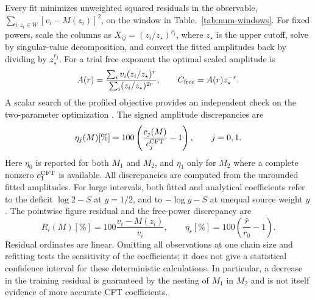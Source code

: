 \documentclass[11pt]{article}
\begin{document}
Every fit minimizes unweighted squared residuals in the
observable, $\sum_{i:z_i\in W}[v_i-M(z_i)]^2$, on the window
in Table.~\ref{tab:num-windows}. For fixed powers, scale the columns as
$X_{ij}=(z_i/z_\star)^{r_j}$, where $z_\star$ is the upper
cutoff, solve by singular-value decomposition, and convert
the fitted amplitudes back by dividing by $z_\star^{r_j}$.
For a trial free exponent the optimal scaled amplitude is
\begin{equation}
 A(r)=\frac{\sum_i v_i(z_i/z_\star)^r}{\sum_i(z_i/z_\star)^{2r}},\qquad C_{\rm free}=A(r)z_\star^{-r}.
 \label{eq:num-profile}
\end{equation}
A scalar search of the profiled objective provides an
independent check on the two-parameter optimization
\cite{numGolubPereyra}. The signed amplitude discrepancies are
\begin{equation}
 \eta_j(M)[\%]=100\left(\frac{c_j(M)}{c_j^{\rm CFT}}-1\right),
 \qquad j=0,1.
 \label{eq:num-residuals}
\end{equation}
Here $\eta_0$ is reported for both $M_1$ and $M_2$, and $\eta_1$
only for $M_2$ where a complete nonzero $c_1^{\rm CFT}$ is available.
All discrepancies are computed from the unrounded fitted amplitudes.
For large intervals, both fitted and analytical coefficients refer to
the deficit $\log2-S$ at $y=1/2$, and to $-\log y-S$ at
unequal source weight $y$.
The pointwise figure residual and the free-power discrepancy are
\begin{equation}
 R_i(M)[\%]=100\frac{v_i-M(z_i)}{v_i},\qquad
 \eta_r[\%]=100\left(\frac{\widehat r}{r_0}-1\right).
 \label{eq:num-point-residuals}
\end{equation}
Residual ordinates are linear. Omitting all observations at one
chain size and refitting tests the sensitivity of the coefficients;
it does not give a statistical confidence interval for these
deterministic calculations. In particular, a decrease in the
training residual is guaranteed by the nesting of $M_1$ in $M_2$
and is not itself evidence of more accurate CFT coefficients.
\end{document}

